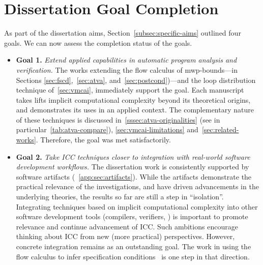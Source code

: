 \section{Dissertation Goal Completion}
\label{sec:res-summary}

As part of the dissertation aims, Section~\autoref{subsec:specific-aims} outlined
four goals. We can now assess the completion status of the goals.

\begin{itemize}

\item[\iconDONE{ }]\textbf{Goal 1.}
    \emph{Extend applied capabilities in automatic program analysis and
      verification.}
    The works extending the flow calculus of mwp-bounds---in Sections
    \autoref{sec:fscd},~\autoref{sec:atva}, and~\autoref{sec:postcond})---and
    the loop distribution technique of~\autoref{sec:vmcai}, immediately support
    the goal. Each manuscript takes lifts implicit computational complexity
    beyond its theoretical origins, and demonstrates its uses in an applied
    context. The complementary nature of these techniques is discussed
    in~\autoref{sssec:atva-originalities} (see in
    particular~\autoref{tab:atva-compare}), \autoref{sec:vmcai-limitations}
    and~\autoref{sec:related-works}. Therefore, the goal was met satisfactorily.

\item[\iconPROG]\textbf{Goal 2.}
    \emph{Take ICC techniques closer to integration with real-world software
      development workflows.}
    The dissertation work is consistently supported by software artifacts
    (\cf~\autoref{app:sec:artifacts}). While the artifacts demonstrate the
    practical relevance of the investigations, and have driven advancements in
    the underlying theories, the results so far are still a step in
    \enquote{isolation}. Integrating techniques based on implicit computational
    complexity into other software development tools (compilers, verifiers,
    \etc) is important to promote relevance and continue advancement of ICC\@.
    Such ambitions encourage thinking about ICC from new (more practical)
    perspectives. However, concrete integration remains as an outstanding goal.
    The work in using the flow calculus to infer
    specification conditions~\cite{rusch2025} is one step
    in that direction.


\end{itemize}
